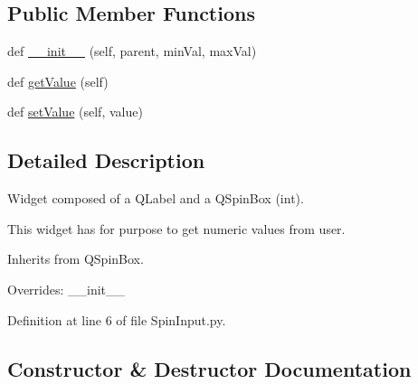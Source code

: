 \subsection*{Public Member Functions}
\begin{DoxyCompactItemize}
\item 
def \mbox{\hyperlink{classwindshape_1_1gui_1_1widgets_1_1inputs_1_1_spin_input_1_1_spin_input_a5293e02b64db6696b89d17b3493b001e}{\+\_\+\+\_\+init\+\_\+\+\_\+}} (self, parent, min\+Val, max\+Val)
\item 
def \mbox{\hyperlink{classwindshape_1_1gui_1_1widgets_1_1inputs_1_1_spin_input_1_1_spin_input_a762076f3e0da3f1c584664b68fb9a838}{get\+Value}} (self)
\item 
def \mbox{\hyperlink{classwindshape_1_1gui_1_1widgets_1_1inputs_1_1_spin_input_1_1_spin_input_aaebdff1c9ac2ab2a7daad81c0e0348fa}{set\+Value}} (self, value)
\end{DoxyCompactItemize}


\subsection{Detailed Description}
\begin{DoxyVerb}Widget composed of a QLabel and a QSpinBox (int).

This widget has for purpose to get numeric values from user.

Inherits from QSpinBox.

Overrides: __init__
\end{DoxyVerb}
 

Definition at line 6 of file Spin\+Input.\+py.



\subsection{Constructor \& Destructor Documentation}
\mbox{\label{classwindshape_1_1gui_1_1widgets_1_1inputs_1_1_spin_input_1_1_spin_input_a5293e02b64db6696b89d17b3493b001e}} 
